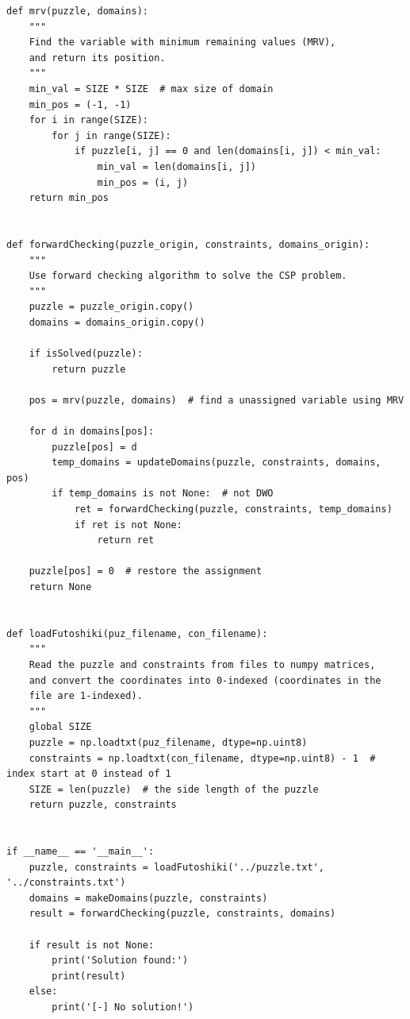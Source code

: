 \documentclass[a4paper, 11pt]{article}
\begin{document}
\begin{lstlisting}[title=python/forward\_checking.py]
def mrv(puzzle, domains):
    """
    Find the variable with minimum remaining values (MRV),
    and return its position.
    """
    min_val = SIZE * SIZE  # max size of domain
    min_pos = (-1, -1)
    for i in range(SIZE):
        for j in range(SIZE):
            if puzzle[i, j] == 0 and len(domains[i, j]) < min_val:
                min_val = len(domains[i, j])
                min_pos = (i, j)
    return min_pos


def forwardChecking(puzzle_origin, constraints, domains_origin):
    """
    Use forward checking algorithm to solve the CSP problem.
    """
    puzzle = puzzle_origin.copy()
    domains = domains_origin.copy()

    if isSolved(puzzle):
        return puzzle

    pos = mrv(puzzle, domains)  # find a unassigned variable using MRV

    for d in domains[pos]:
        puzzle[pos] = d
        temp_domains = updateDomains(puzzle, constraints, domains, pos)
        if temp_domains is not None:  # not DWO
            ret = forwardChecking(puzzle, constraints, temp_domains)
            if ret is not None:
                return ret

    puzzle[pos] = 0  # restore the assignment
    return None


def loadFutoshiki(puz_filename, con_filename):
    """
    Read the puzzle and constraints from files to numpy matrices,
    and convert the coordinates into 0-indexed (coordinates in the
    file are 1-indexed).
    """
    global SIZE
    puzzle = np.loadtxt(puz_filename, dtype=np.uint8)
    constraints = np.loadtxt(con_filename, dtype=np.uint8) - 1  # index start at 0 instead of 1
    SIZE = len(puzzle)  # the side length of the puzzle
    return puzzle, constraints


if __name__ == '__main__':
    puzzle, constraints = loadFutoshiki('../puzzle.txt', '../constraints.txt')
    domains = makeDomains(puzzle, constraints)
    result = forwardChecking(puzzle, constraints, domains)

    if result is not None:
        print('Solution found:')
        print(result)
    else:
        print('[-] No solution!')
\end{lstlisting}
\end{document}
